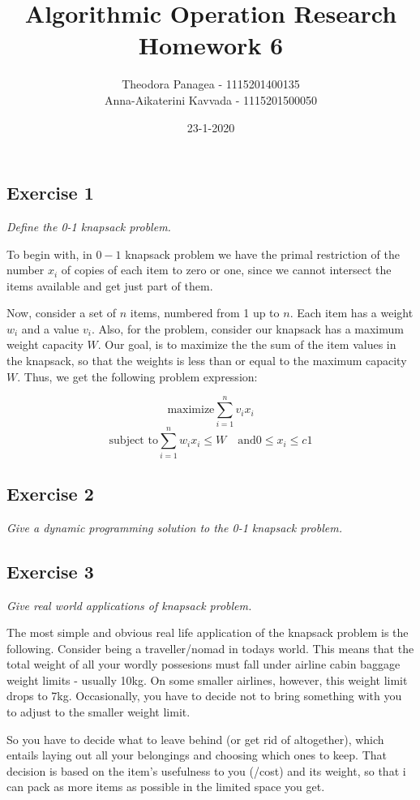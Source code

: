 \documentclass[12pt]{article}
\title{Algorithmic Operation Research \\ Homework 6}
\date{23-1-2020}
\author{Theodora Panagea - 1115201400135 \\ Anna-Aikaterini Kavvada - 1115201500050}
\begin{document}
	\maketitle{}
 
 \newpage
\subsection*{Exercise 1}
\textit{Define the 0-1 knapsack problem.}\newline

To begin with, in $0-1$ knapsack problem we have the primal restriction of the number $x_i$ of copies of each item to zero or one, since we cannot intersect the items available and get just part of them. \par
Now, consider a set of $n$ items, numbered from 1 up to $n$. Each item has a weight $w_i$ and a value $v_i$. Also, for the problem, consider our knapsack has a maximum weight capacity $W$. Our goal, is to maximize the the sum of the item values in the knapsack, so that the weights is less than or equal to the maximum capacity $W$. Thus, we get the following problem expression:

$$\text{maximize} \sum_{i=1}^{n} v_i x_i$$
$$\text{subject to} \sum_{i=1}^{n} w_i x_i \leq W \quad \text{and} 0 \leq x_i \leq c1$$

\newpage

\subsection*{Exercise 2}
\textit{Give a dynamic programming solution to the 0-1 knapsack problem.}\newline

\newpage

\subsection*{Exercise 3}
\textit{Give real world applications of knapsack problem.}\newline

The most simple and obvious real life application of the knapsack problem is the following. Consider being a traveller/nomad in todays world. This means that the total weight of all your wordly possesions must fall under airline cabin baggage weight limits - usually 10kg. On some smaller airlines, however, this weight limit drops to 7kg. Occasionally, you have to decide not to bring something with you to adjust to the smaller weight limit. \par
So you have to decide what to leave behind (or get rid of altogether), which entails laying out all your belongings and choosing which ones to keep. That decision is based on the item's usefulness to you (/cost) and its weight, so that i can pack as more items as possible in the limited space you get.
\end{document}
